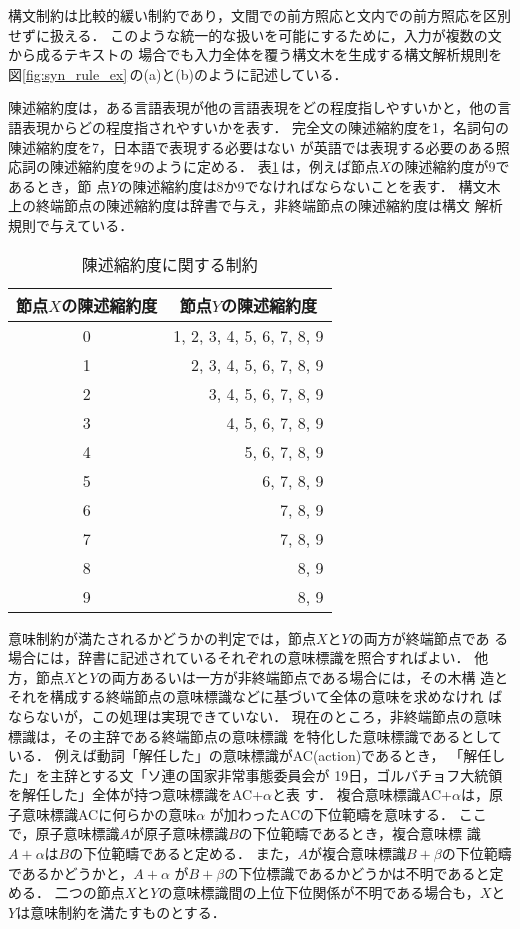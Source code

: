 構文制約は比較的緩い制約であり，文間での前方照応と文内での前方照応を区別
せずに扱える．
このような統一的な扱いを可能にするために，入力が複数の文から成るテキストの
場合でも入力全体を覆う構文木を生成する構文解析規則を
図\ref{fig:syn_rule_ex}\,の(a)と(b)のように記述している．

陳述縮約度は，ある言語表現が他の言語表現をどの程度指しやすいかと，他の言
語表現からどの程度指されやすいかを表す．
完全文の陳述縮約度を1，名詞句の陳述縮約度を7，日本語で表現する必要はない
が英語では表現する必要のある照応詞の陳述縮約度を9のように定める．
表\ref{tab:depredlevel}\,は，例えば節点$X$の陳述縮約度が9であるとき，節
点$Y$の陳述縮約度は8か9でなければならないことを表す．
構文木上の終端節点の陳述縮約度は辞書で与え，非終端節点の陳述縮約度は構文
解析規則で与えている．
\begin{table}[tbhp]
\caption{陳述縮約度に関する制約}
\label{tab:depredlevel}
\begin{center}
\begin{tabular}{|c||r|}\hline
節点$X$の陳述縮約度&\multicolumn{1}{c|}{節点$Y$の陳述縮約度}\\
\hline\hline
0 & 1, 2, 3, 4, 5, 6, 7, 8, 9 \\
1 & 2, 3, 4, 5, 6, 7, 8, 9 \\
2 & 3, 4, 5, 6, 7, 8, 9 \\
3 & 4, 5, 6, 7, 8, 9 \\
4 & 5, 6, 7, 8, 9 \\
5 & 6, 7, 8, 9 \\
6 & 7, 8, 9 \\
7 & 7, 8, 9 \\
8 & 8, 9 \\
9 & 8, 9 \\\hline
\end{tabular}
\end{center}
\end{table}

意味制約が満たされるかどうかの判定では，節点$X$と$Y$の両方が終端節点であ
る場合には，辞書に記述されているそれぞれの意味標識を照合すればよい．
他方，節点$X$と$Y$の両方あるいは一方が非終端節点である場合には，その木構
造とそれを構成する終端節点の意味標識などに基づいて全体の意味を求めなけれ
ばならないが，この処理は実現できていない．
現在のところ，非終端節点の意味標識は，その主辞である終端節点の意味標識
を特化した意味標識であるとしている．
例えば動詞「解任した」の意味標識がAC(action)であるとき，
「解任した」を主辞とする文「ソ連の国家非常事態委員会が
19日，ゴルバチョフ大統領を解任した」全体が持つ意味標識をAC+$\alpha$と表
す．
複合意味標識AC+$\alpha$は，原子意味標識ACに何らかの意味$\alpha$
が加わったACの下位範疇を意味する．
ここで，原子意味標識$A$が原子意味標識$B$の下位範疇であるとき，複合意味標
識$A+\alpha$は$B$の下位範疇であると定める．
また，$A$が複合意味標識$B+\beta$の下位範疇であるかどうかと，$A+\alpha$
が$B+\beta$の下位標識であるかどうかは不明であると定める．
二つの節点$X$と$Y$の意味標識間の上位下位関係が不明である場合も，$X$と
$Y$は意味制約を満たすものとする．

